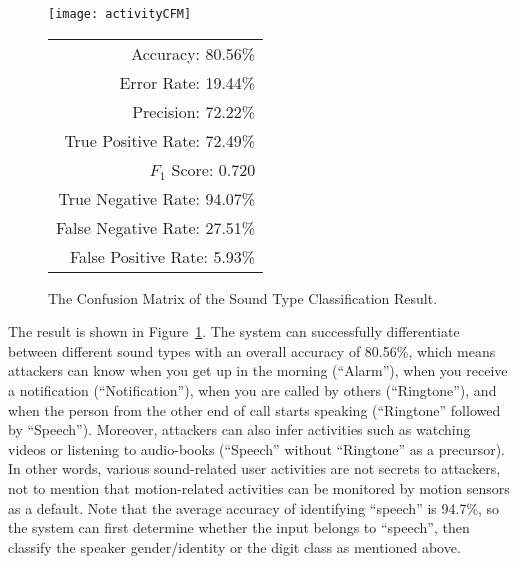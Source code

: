 \begin{figure}[ht]
	\begin{minipage}{\linewidth}
		\centering
		\begin{minipage}[c]{0.5\linewidth}			
			\texttt{[image: activityCFM]}
		\end{minipage}
		\begin{minipage}[b]{0.49\linewidth}
			\centering
			\begin{tabular}{r}
				\toprule
				Accuracy: 80.56\% \\ Error Rate: 19.44\% \\
				Precision: 72.22\% \\ True Positive Rate: 72.49\% \\
				$F_1$ Score: 0.720\\ True Negative Rate: 94.07\% \\
				False Negative Rate: 27.51\% \\ False Positive Rate: 5.93\% \\
				\bottomrule
			\end{tabular}
		\end{minipage}
	\end{minipage}
	
	\vspace{-.1in}
	\caption{The Confusion Matrix of the Sound Type Classification Result.}
	\label{fig:activityCFM}
	\vspace{-.1in}
\end{figure}

The result is shown in Figure~\ref{fig:activityCFM}.
 The {\systemName} system can successfully differentiate between different sound types with an overall accuracy of 80.56\%, which means attackers can know when you get up in the morning (``Alarm''), when you receive a notification (``Notification''), when you are called by others (``Ringtone''), and when the person from the other end of call starts speaking (``Ringtone'' followed by ``Speech''). Moreover, attackers can also infer activities such as watching videos or listening to audio-books (``Speech'' without ``Ringtone'' as a precursor). In other words, various sound-related user activities are not secrets to {\attackName} attackers, not to mention that motion-related activities can be monitored by motion sensors as a default.
%
Note that the average accuracy of identifying ``speech'' is 94.7\%, so the {\systemName} system can first determine whether the input belongs to ``speech'', then classify the speaker gender/identity or the digit class as mentioned above. 


